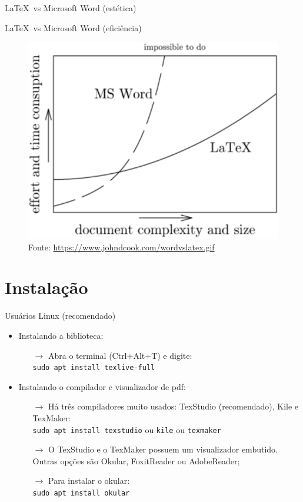\documentclass[c]{beamer}
\begin{document}
{\begin{frame}[fragile]{\sc \LaTeX \ vs Microsoft Word (estética)}
    \end{frame}
    
    \begin{frame}[fragile]{\sc \LaTeX \ vs Microsoft Word (eficiência)}
        
	    \begin{figure}[b!]
		    \centering
		    \includegraphics[width=0.7\linewidth]{images/wordvslatex.pdf}
		    \caption{Fonte: \url{https://www.johndcook.com/wordvslatex.gif}}
		    \label{latex_vs_word2}
	    \end{figure}
	    
    \end{frame}
    
\section{Instalação}
    
    \begin{frame}[fragile]{\sc Usuários Linux (recomendado)}
        
        \begin{itemize}
        \setlength\itemsep{0.2cm}
	        \item Instalando a biblioteca:
	        \begin{itemize}
                \item[$\to$] Abra o terminal (Ctrl+Alt+T) e digite:\\
                    \texttt{sudo apt install texlive-full}
            \end{itemize}
	        \item Instalando o compilador e visualizador de pdf:
	        \begin{itemize}
		        \item[$\to$] Há três compiladores muito usados:  TexStudio (recomendado), Kile e  TexMaker:\\
		            \texttt{sudo apt install texstudio} ou \texttt{kile} ou \texttt{texmaker}
    		    \item[$\to$] O TexStudio e o TexMaker possuem um visualizador embutido. Outras opções são Okular, FoxitReader ou AdobeReader;
		        \item[$\to$] Para instalar o okular:\\
		            \texttt{sudo apt install okular}
	        \end{itemize}
        \end{itemize}
        

\end{frame}}
\end{document}
